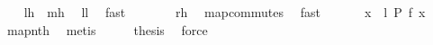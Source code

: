 \begin{isabellebody}
\ \ \isamarkupfalse%
\ {\isachardoublequoteopen}{\isacharquery}lh\ {\isacharequal}\ {\isacharquery}mh{\isachardoublequoteclose}\ \isamarkupfalse%
\ ll{}{}\ \isamarkupfalse%
\ fast\isanewline
\ \ \isamarkupfalse%
\ \isamarkupfalse%
\ {\isachardoublequoteopen}{\isachardot}{\isachardot}{\isachardot}\ {\isacharequal}\ {\isacharquery}rh{\isachardoublequoteclose}\ \isamarkupfalse%
\ map{\isacharunderscore}commutes\ \isamarkupfalse%
\ fast\isanewline
\ \ \isamarkupfalse%
\ \isamarkupfalse%
\ {\isachardoublequoteopen}{\isachardot}{\isachardot}{\isachardot}{\isacharequal}\ {\isacharbrackleft}x\ {\isacharless}{\isacharminus}\ l{\isachardot}\ {\isacharquery}P\ {\isacharparenleft}f\ x{\isacharparenright}{\isacharbrackright}{\isachardoublequoteclose}\ \isamarkupfalse%
\ map{\isacharunderscore}nth\ \isamarkupfalse%
\ metis\isanewline
\ \ \isamarkupfalse%
\ \isamarkupfalse%
\ {\isacharquery}thesis\ \isamarkupfalse%
\ force\isanewline
{}\isamarkupfalse%
%
\endisatagproof
{\isafoldproof}%
%
\isadelimproof
\isanewline
%
\endisadelimproof
%
\isadelimtheory
\isanewline
%
\endisadelimtheory
%
\isatagtheory
{}\isamarkupfalse%
%
\endisatagtheory
{\isafoldtheory}%
%
\isadelimtheory
%
\endisadelimtheory
\end{isabellebody}%

